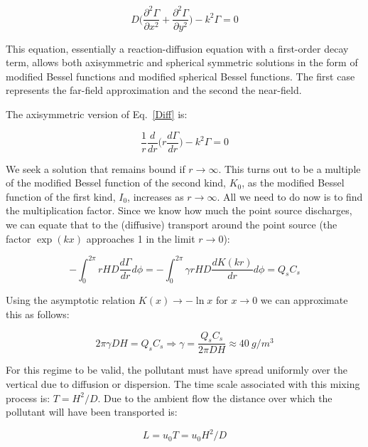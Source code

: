 \documentclass[onecolumn]{article}
\begin{document}
\begin{equation}
\label{Diff}
D \bigl ( \frac{\partial^2 \Gamma}{\partial x^2} + \frac{\partial^2 \Gamma}{\partial y^2} \bigr ) - k^2 \Gamma = 0
\end{equation}

This equation, essentially a reaction-diffusion equation with a first-order decay term,
allows both axisymmetric and spherical symmetric solutions in the form of modified
Bessel functions and modified spherical Bessel functions. The first case represents the far-field
approximation and the second the near-field.

The axisymmetric version of Eq.\ \ref{Diff} is:

\begin{equation}
\frac{1}{r}\frac{d}{dr} \bigl ( r \frac{d \Gamma}{dr} \bigr ) - k^2 \Gamma = 0
\end{equation}

We seek a solution that remains bound if \(r \rightarrow \infty\). This turns out to be a multiple of
the modified Bessel function of the second kind, \(K_0\), as the modified Bessel function of the first kind, \(I_0\),
increases as \(r \rightarrow \infty\). All we need to do now is to find the multiplication factor.
Since we know how much the point source discharges, we can equate that to the (diffusive) transport
around the point source (the factor \(\exp(kx)\) approaches 1 in the limit \(r \rightarrow 0\)):

\begin{equation}
- \int_0^{2 \pi} r H D \frac{d \Gamma}{d r} d \phi = - \int_0^{2 \pi} \gamma r H D \frac{d K(kr)}{d r} d \phi = Q_s C_s
\end{equation}

Using the asymptotic relation \(K(x) \rightarrow -\ln x\) for \(x \rightarrow 0\) we can approximate this
as follows:

\begin{equation}
  2 \pi \gamma D H = Q_s C_s \Rightarrow \gamma = \frac{Q_s C_s}{2 \pi D H} \approx 40~g/m^3
\end{equation}

For this regime to be valid, the pollutant must have spread uniformly over the vertical due to diffusion or
dispersion. The time scale associated with this mixing process is: \(T = H^2/D\). Due to the ambient flow
the distance over which the pollutant will have been transported is:

\begin{equation}
  L = u_0 T = u_0 H^2 / D
\end{equation}
\end{document}

